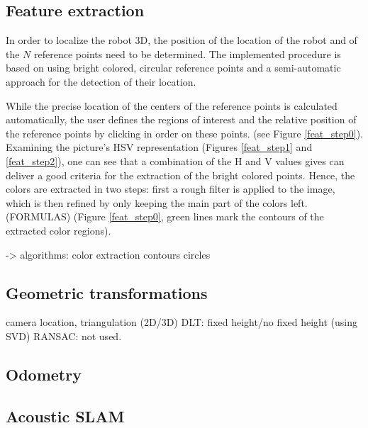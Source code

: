 \subsection{Feature extraction}

In order to localize the robot 3D, the position of the location of the robot and of the $N$ reference points need to be determined. The implemented procedure is based on using bright colored, circular reference points and a semi-automatic approach for the detection of their location. 

While the precise location of the centers of the reference points is calculated automatically, the user defines the regions of interest and the relative position of the reference points by clicking in order on these points. (see Figure \ref{feat_step0}). Examining the picture's HSV representation (Figures \ref{feat_step1} and \ref{feat_step2}), one can see that a combination of the H and V values gives can deliver a good criteria for the extraction of the bright colored points. Hence, the colors are extracted in two steps: first a rough filter is applied to the image, which is then refined by only keeping the main part of the colors left. (FORMULAS) (Figure \ref{feat_step0}, green lines mark the contours of the extracted color regions).

-> algorithms:
color extraction
contours
circles

\subsection{Geometric transformations}

camera location, triangulation (2D/3D) 
DLT: fixed height/no fixed height (using SVD)
RANSAC: not used. 





\subsection{Odometry}

\subsection{Acoustic SLAM}  
